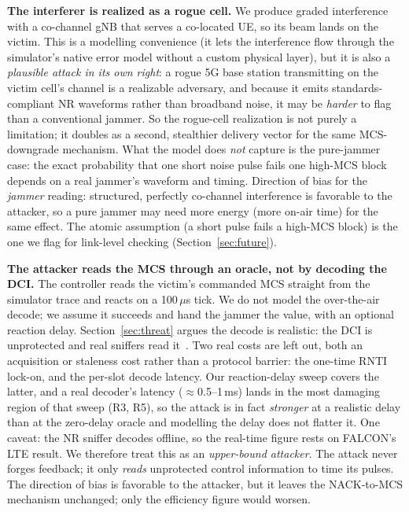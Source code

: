 \documentclass[conference]{IEEEtran}
\begin{document}
\textbf{The interferer is realized as a rogue cell.} We produce graded interference with
a co-channel gNB that serves a co-located UE, so its beam lands on the victim. This is a
modelling convenience (it lets the interference flow through the simulator's native error
model without a custom physical layer), but it is also a \emph{plausible attack in its own
right}: a rogue 5G base station transmitting on the victim cell's channel is a
realizable adversary, and because it emits standards-compliant NR waveforms rather than
broadband noise, it may be \emph{harder} to flag than a conventional jammer. So the
rogue-cell realization is not purely a limitation; it doubles as a second, stealthier
delivery vector for the same MCS-downgrade mechanism. What the model does \emph{not}
capture is the pure-jammer case: the exact probability that one short noise pulse fails one
high-MCS block depends on a real jammer's waveform and timing. Direction of bias for the
\emph{jammer} reading: structured, perfectly co-channel interference is favorable to the
attacker, so a pure jammer may need more energy (more on-air time) for the same effect.
The atomic assumption (a short pulse fails a high-MCS block) is the one we flag for
link-level checking (Section~\ref{sec:future}).

\textbf{The attacker reads the MCS through an oracle, not by decoding the DCI.} The
controller reads the victim's commanded MCS straight from the simulator trace and reacts
on a 100\,$\mu$s tick. We do not model the over-the-air decode; we assume it succeeds and
hand the jammer the value, with an optional reaction delay. Section~\ref{sec:threat}
argues the decode is realistic: the DCI is unprotected and real sniffers read
it~\cite{falkenberg2019falcon,ludant2023sniffing}. Two real costs are left out, both an
acquisition or staleness cost rather than a protocol barrier: the one-time RNTI lock-on,
and the per-slot decode latency. Our reaction-delay sweep covers the latter, and a real
decoder's latency ($\approx$0.5--1\,ms) lands in the most damaging region of that sweep
(R3, R5), so the attack is in fact \emph{stronger} at a realistic delay than at the
zero-delay oracle and modelling the delay does not flatter it. One caveat: the NR sniffer
decodes offline, so the real-time figure rests on FALCON's LTE result. We therefore treat
this as an \emph{upper-bound attacker}. The attack never forges feedback; it only
\emph{reads} unprotected control information to time its pulses. The direction of bias is
favorable to the attacker, but it leaves the NACK-to-MCS mechanism unchanged; only the
efficiency figure would worsen.
\end{document}
